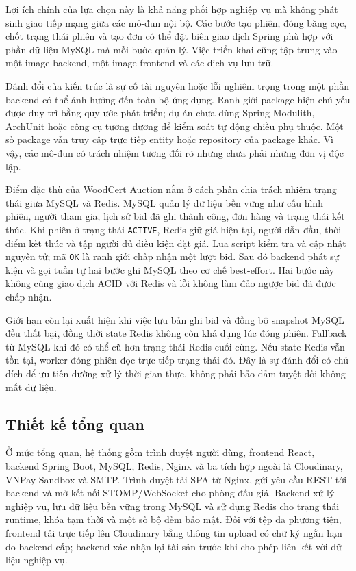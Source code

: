 \documentclass[../DoAn.tex]{subfiles}
\begin{document}
Lợi ích chính của lựa chọn này là khả năng phối hợp nghiệp vụ mà không phát sinh giao tiếp mạng giữa các mô-đun nội bộ. Các bước tạo phiên, đóng băng cọc, chốt trạng thái phiên và tạo đơn có thể đặt biên giao dịch Spring phù hợp với phần dữ liệu MySQL mà mỗi bước quản lý. Việc triển khai cũng tập trung vào một image backend, một image frontend và các dịch vụ lưu trữ.

Đánh đổi của kiến trúc là sự cố tài nguyên hoặc lỗi nghiêm trọng trong một phần backend có thể ảnh hưởng đến toàn bộ ứng dụng. Ranh giới package hiện chủ yếu được duy trì bằng quy ước phát triển; dự án chưa dùng Spring Modulith, ArchUnit hoặc công cụ tương đương để kiểm soát tự động chiều phụ thuộc. Một số package vẫn truy cập trực tiếp entity hoặc repository của package khác. Vì vậy, các mô-đun có trách nhiệm tương đối rõ nhưng chưa phải những đơn vị độc lập.

Điểm đặc thù của WoodCert Auction nằm ở cách phân chia trách nhiệm trạng thái giữa MySQL và Redis. MySQL quản lý dữ liệu bền vững như cấu hình phiên, người tham gia, lịch sử bid đã ghi thành công, đơn hàng và trạng thái kết thúc. Khi phiên ở trạng thái \texttt{ACTIVE}, Redis giữ giá hiện tại, người dẫn đầu, thời điểm kết thúc và tập người đủ điều kiện đặt giá. Lua script kiểm tra và cập nhật nguyên tử; mã \texttt{OK} là ranh giới chấp nhận một lượt bid. Sau đó backend phát sự kiện và gọi tuần tự hai bước ghi MySQL theo cơ chế best-effort. Hai bước này không cùng giao dịch ACID với Redis và lỗi không làm đảo ngược bid đã được chấp nhận.

Giới hạn còn lại xuất hiện khi việc lưu bản ghi bid và đồng bộ snapshot MySQL đều thất bại, đồng thời state Redis không còn khả dụng lúc đóng phiên. Fallback từ MySQL khi đó có thể cũ hơn trạng thái Redis cuối cùng. Nếu state Redis vẫn tồn tại, worker đóng phiên đọc trực tiếp trạng thái đó. Đây là sự đánh đổi có chủ đích để ưu tiên đường xử lý thời gian thực, không phải bảo đảm tuyệt đối không mất dữ liệu.

\subsection{Thiết kế tổng quan}

Ở mức tổng quan, hệ thống gồm trình duyệt người dùng, frontend React, backend Spring Boot, MySQL, Redis, Nginx và ba tích hợp ngoài là Cloudinary, VNPay Sandbox và SMTP. Trình duyệt tải SPA từ Nginx, gửi yêu cầu REST tới backend và mở kết nối STOMP/WebSocket cho phòng đấu giá. Backend xử lý nghiệp vụ, lưu dữ liệu bền vững trong MySQL và sử dụng Redis cho trạng thái runtime, khóa tạm thời và một số bộ đếm bảo mật. Đối với tệp đa phương tiện, frontend tải trực tiếp lên Cloudinary bằng thông tin upload có chữ ký ngắn hạn do backend cấp; backend xác nhận lại tài sản trước khi cho phép liên kết với dữ liệu nghiệp vụ.
\end{document}
